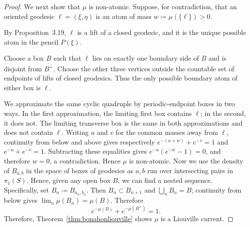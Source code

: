 \begin{proof}
We next show that $\mu$ is non-atomic. Suppose, for
contradiction, that an oriented geodesic $\ell=(\xi,\eta)$ is an atom
of mass $w\coloneqq\mu(\{\ell\})>0$.

By Proposition~3.19, $\ell$ is a lift of a closed geodesic, and it is
the unique possible atom in the pencil $P(\xi)$.

Choose a box $B$ such that $\ell$ lies on exactly one boundary side
of $B$ and is disjoint from $\overline{B^\perp}$. Choose the other
three vertices outside the countable set of endpoints of lifts of
closed geodesics. Thus the only possible boundary atom of either box
is $\ell$.

We approximate the same
cyclic quadruple by periodic-endpoint boxes in two ways. In the first
approximation, the limiting first box contains $\ell$; in the second,
it does not. The limiting transverse box is the same in both
approximations and does not contain $\ell$. Writing $u$ and $v$ for
the common masses away from $\ell$, continuity from below and above
gives respectively $e^{-(u+w)}+e^{-v}=1$
and $e^{-u}+e^{-v}=1$. Subtracting these equalities gives $e^{-u}(e^{-w}-1)=0$,
and therefore $w=0$, a contradiction. Hence $\mu$ is non-atomic. Now we use the
density of $B_{a,b}$ in the space of boxes of geodesics as $a,b$ run
over intersecting pairs in $\pi_1(S)$. Hence, given any open box $B$,
we can find a nested sequence. Specifically, set $B_n \coloneqq
B_{a_n,b_n}$. Then $B_n\subset B_{n+1}$ and $\bigcup_n B_n=B$;
continuity from below gives $\lim_n\mu(B_n)=\mu(B)$. Therefore
\[
e^{-\mu(B)} + e^{-\mu(B^{\perp})}=1.
\]
Therefore, Theorem~\ref{thm:bonahonliouville} shows $\mu$ is a Liouville current.
\end{proof}


